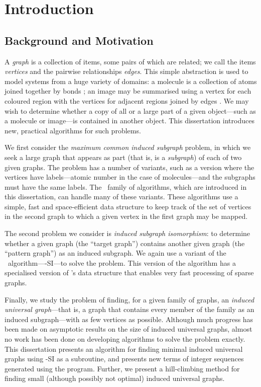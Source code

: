 \chapter{Introduction}
\label{c:intro}

\newcommand{\ChapterRef}[1] {\Cref{#1}: \nameref{#1}}

\section{Background and Motivation}
A \emph{graph} is a collection of items, some pairs of which are related; we
call the items \emph{vertices} and the pairwise relationships \emph{edges}.
This simple abstraction
is used to model systems from a huge variety of domains: a molecule is a
collection of atoms joined together by bonds \citep{sussenguth1965graph}; an
image may be summarised using a vertex for each coloured region with the
vertices for adjacent regions joined by edges
\citep{DBLP:conf/icip/OlatunbosunDE96}.  We may wish to determine whether a
copy of all
or a large part of a given object---such as a molecule or image---is contained
in another object.  This dissertation introduces new,
practical algorithms for such problems.

We first consider the \emph{maximum common induced subgraph} problem,
in which we seek a large graph that appears as part (that is,
is a \emph{subgraph}) of each of two
given graphs.  The problem has a number of variants, such as a version where
the vertices have labels---atomic number in the case of molecules---and
the subgraphs must have the same labels.
The \McSplit\ family of algorithms, which are introduced
in this dissertation, can handle many of these variants.
These algorithms
use a simple, fast and space-efficient data structure to keep track of the set
of vertices in the second graph to which a given vertex in the first graph may
be mapped.

The second problem we consider is \emph{induced subgraph isomorphism}: to
determine whether a given graph (the ``target graph'') contains another given
graph (the ``pattern graph'') as an induced subgraph.  We again use a variant
of the \McSplit\ algorithm---\McSplit-SI---to solve the problem. This version
of the algorithm has a specialised version of \McSplit's data structure that
enables very fast processing of sparse graphs.

Finally, we study the problem of finding, for a given family of graphs,
an \textit{induced universal graph}---that is, a graph that contains every
member of the family as an induced subgraph---with as few vertices as
possible.
Although much progress has
been made on asymptotic results on the size of induced universal graphs, almost no
work has been done on developing algorithms to solve the problem exactly.  This
dissertation presents an algorithm for finding minimal induced universal graphs
using \McSplit-SI as a subroutine, and presents new terms of integer sequences
generated using the program.  Further, we present a hill-climbing method for
finding small (although possibly not optimal) induced universal graphs.

